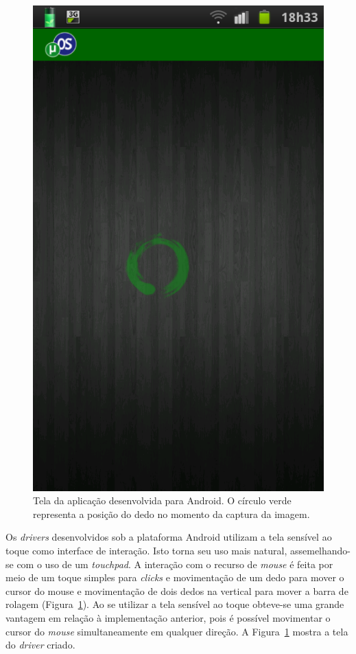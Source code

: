\begin{figure}[h]
\begin{minipage}[t]{0.30\linewidth}
		\includegraphics[width=\linewidth]{imagens/printscreen_android}
		\caption{Tela da aplicação desenvolvida para Android. O círculo verde representa a posição do dedo no momento da captura da imagem.}
		\label{fig:printscreen_android}
	\end{minipage}
\end{figure}

Os \emph{drivers} desenvolvidos sob a plataforma Android utilizam a tela sensível ao toque como interface de interação. Isto torna seu uso mais natural, assemelhando-se com o uso de um \emph{touchpad}. A interação com o recurso de \emph{mouse} é feita por meio de um toque simples para \emph{clicks} e movimentação de um dedo para mover o cursor do mouse e movimentação de dois dedos na vertical para mover a barra de rolagem (Figura~\ref{fig:printscreen_android}). Ao se utilizar a tela sensível ao toque obteve-se uma grande vantagem em relação à implementação anterior, pois é possível movimentar o cursor do \emph{mouse} simultaneamente em qualquer direção. A Figura~\ref{fig:printscreen_android} mostra a tela do \emph{driver} criado.	

